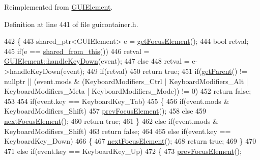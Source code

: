 Reimplemented from \hyperlink{classGUIElement_aa85f949aa746eac4deadfa0bb8827f71}{G\+U\+I\+Element}.



Definition at line 441 of file guicontainer.\+h.


\begin{DoxyCode}
442         \{
443             shared\_ptr<GUIElement> e = \hyperlink{classGUIContainer_addf987ba650075a7c0f34c571debd6a2}{getFocusElement}();
444             \textcolor{keywordtype}{bool} retval;
445             \textcolor{keywordflow}{if}(e == \hyperlink{classGUIElement_a5ad5998c5b953b6c6e32b583ddf9cd97}{shared\_from\_this}())
446                 retval = \hyperlink{classGUIElement_aa85f949aa746eac4deadfa0bb8827f71}{GUIElement::handleKeyDown}(event);
447             \textcolor{keywordflow}{else}
448                 retval = e->handleKeyDown(event);
449             \textcolor{keywordflow}{if}(retval)
450                 \textcolor{keywordflow}{return} \textcolor{keyword}{true};
451             \textcolor{keywordflow}{if}(\hyperlink{classGUIElement_aded5837705c097a7a8a755df28c572e6}{getParent}() != \textcolor{keyword}{nullptr} || (event.mods & (KeyboardModifiers\_Ctrl | 
      KeyboardModifiers\_Alt | KeyboardModifiers\_Meta | KeyboardModifiers\_Mode)) != 0)
452                 \textcolor{keywordflow}{return} \textcolor{keyword}{false};
453 
454             \textcolor{keywordflow}{if}(event.key == KeyboardKey\_Tab)
455             \{
456                 \textcolor{keywordflow}{if}(event.mods & KeyboardModifiers\_Shift)
457                     \hyperlink{classGUIContainer_afa186df2611c4e309094e8da2654f5b2}{prevFocusElement}();
458                 \textcolor{keywordflow}{else}
459                     \hyperlink{classGUIContainer_a83c20737ae89ecdb0da054cec1ca087e}{nextFocusElement}();
460                 \textcolor{keywordflow}{return} \textcolor{keyword}{true};
461             \}
462             \textcolor{keywordflow}{else} \textcolor{keywordflow}{if}(event.mods & KeyboardModifiers\_Shift)
463                 \textcolor{keywordflow}{return} \textcolor{keyword}{false};
464 
465             \textcolor{keywordflow}{else} \textcolor{keywordflow}{if}(event.key == KeyboardKey\_Down)
466             \{
467                 \hyperlink{classGUIContainer_a83c20737ae89ecdb0da054cec1ca087e}{nextFocusElement}();
468                 \textcolor{keywordflow}{return} \textcolor{keyword}{true};
469             \}
470 
471             \textcolor{keywordflow}{else} \textcolor{keywordflow}{if}(event.key == KeyboardKey\_Up)
472             \{
473                 \hyperlink{classGUIContainer_afa186df2611c4e309094e8da2654f5b2}{prevFocusElement}();

\end{DoxyCode}
